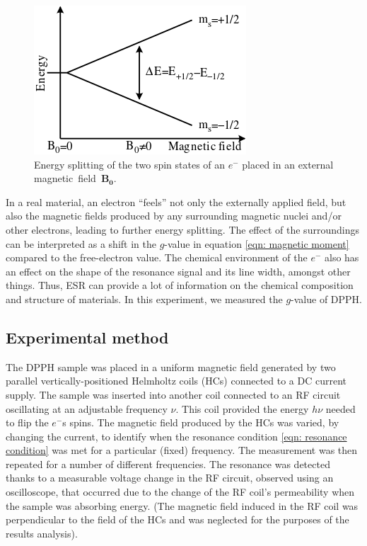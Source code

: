 \documentclass[a4paper]{jpconf}
\numberwithin{equation}{section}
\begin{document}
\begin{figure}[htbp]
	\includegraphics{EPR_splitting.png}
	\caption{Energy splitting of the two spin states of an $e^-$ placed in an external magnetic~field~$\mathbf{B_0}$.}
	\label{fig: energy splitting}
\end{figure}

In a real material, an electron ``feels'' not only the externally applied field, but also the magnetic fields produced by any surrounding magnetic nuclei and/or other electrons, leading to further energy splitting. The effect of the surroundings can be interpreted as a shift in the $g$-value in equation \eqref{eqn: magnetic moment} compared to the free-electron value. The chemical environment of the $e^-$ also has an effect on the shape of the resonance signal and its line width, amongst other things. Thus, ESR can provide a lot of information on the chemical composition and structure of materials. In this experiment, we measured the $g$-value of DPPH.

\subsection{Experimental method}\label{section: method}
The DPPH sample was placed in a uniform magnetic field generated by two parallel vertically-positioned Helmholtz coils (HCs) connected to a DC current supply. The sample was inserted into another coil connected to an RF circuit oscillating at an adjustable frequency $\nu$. This coil provided the energy $h\nu$ needed to flip the $e^-$s spins. The magnetic field produced by the HCs was varied, by changing the current, to identify when the resonance condition \eqref{eqn: resonance condition} was met for a particular (fixed) frequency. The measurement was then repeated for a number of different frequencies. The resonance was detected thanks to a measurable voltage change in the RF circuit, observed using an oscilloscope, that occurred due to the change of the RF coil's permeability when the sample was absorbing energy. (The magnetic field induced in the RF coil was perpendicular to the field of the HCs and was neglected for the purposes of the results analysis).
\end{document}
